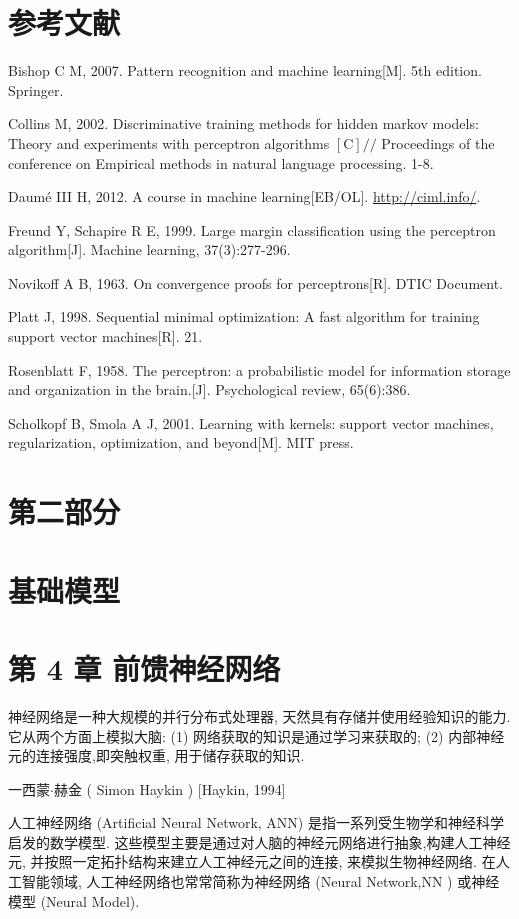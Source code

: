 \documentclass[10pt]{article}
\begin{document}
\section*{参考文献}
Bishop C M, 2007. Pattern recognition and machine learning[M]. 5th edition. Springer.

Collins M, 2002. Discriminative training methods for hidden markov models: Theory and experiments with perceptron algorithms $[\mathrm{C}] / /$ Proceedings of the conference on Empirical methods in natural language processing. 1-8.

Daumé III H, 2012. A course in machine learning[EB/OL]. \href{http://ciml.info/}{http://ciml.info/}.

Freund Y, Schapire R E, 1999. Large margin classification using the perceptron algorithm[J]. Machine learning, 37(3):277-296.

Novikoff A B, 1963. On convergence proofs for perceptrons[R]. DTIC Document.

Platt J, 1998. Sequential minimal optimization: A fast algorithm for training support vector machines[R]. 21.

Rosenblatt F, 1958. The perceptron: a probabilistic model for information storage and organization in the brain.[J]. Psychological review, 65(6):386.

Scholkopf B, Smola A J, 2001. Learning with kernels: support vector machines, regularization, optimization, and beyond[M]. MIT press.

\section*{第二部分}
\section*{基础模型}
\section*{第 4 章 前馈神经网络}
神经网络是一种大规模的并行分布式处理器, 天然具有存储并使用经验知识的能力. 它从两个方面上模拟大脑: (1) 网络获取的知识是通过学习来获取的; (2) 内部神经元的连接强度,即突触权重, 用于储存获取的知识.

一西蒙$\cdot$赫金 ( Simon Haykin ) [Haykin, 1994]

人工神经网络 (Artificial Neural Network, ANN) 是指一系列受生物学和神经科学启发的数学模型. 这些模型主要是通过对人脑的神经元网络进行抽象,构建人工神经元, 并按照一定拓扑结构来建立人工神经元之间的连接, 来模拟生物神经网络. 在人工智能领域, 人工神经网络也常常简称为神经网络 (Neural Network,NN ) 或神经模型 (Neural Model).
\end{document}
